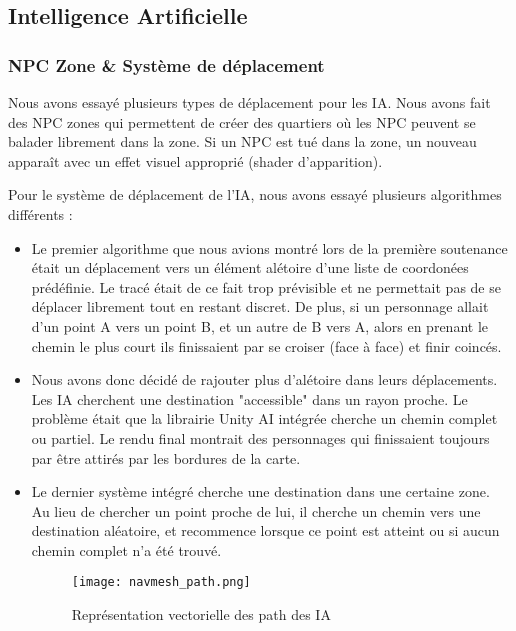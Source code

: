 \subsection{Intelligence Artificielle}
    \subsubsection{NPC Zone \& Système de déplacement}
    Nous avons essayé plusieurs types de déplacement pour les IA. Nous avons fait des NPC zones qui permettent de créer des quartiers
    où les NPC peuvent se balader librement dans la zone. Si un NPC est tué dans la zone, un nouveau apparaît avec un effet visuel 
    approprié (shader d'apparition).
    \newline
    
    Pour le système de déplacement de l'IA,
    nous avons essayé plusieurs algorithmes différents :\newline
    
    \begin{itemize}
        \item Le premier algorithme que nous avions montré lors de la première soutenance
        était un déplacement vers un élément alétoire d'une liste de coordonées prédéfinie.
        Le tracé était de ce fait trop prévisible et ne permettait pas de se déplacer librement tout en restant discret.
        De plus, si un personnage allait d'un point A vers un point B, et un autre de B vers A,
        alors en prenant le chemin le plus court ils finissaient par se croiser (face à face) et finir coincés.
        \newline
        \item  Nous avons donc décidé de rajouter plus d'alétoire dans leurs déplacements.
        Les IA cherchent une destination "accessible" dans un rayon proche.
        Le problème était que la librairie Unity AI intégrée cherche un chemin complet ou partiel.
        Le rendu final montrait des personnages qui finissaient toujours par être attirés par les bordures de la carte.
        \newline

        \item  Le dernier système intégré cherche une destination dans une certaine zone.
        Au lieu de chercher un point proche de lui, il cherche un chemin vers une destination aléatoire, 
        et recommence lorsque ce point est atteint ou si aucun chemin complet n'a été trouvé.

        
        \begin{figure}[hbt!]
            \centering
            \texttt{[image: navmesh\_path.png]}
            \caption{Représentation vectorielle des path des IA}
        \end{figure}
    

    \end{itemize}
    
